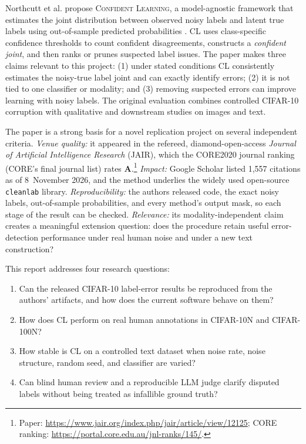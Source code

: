 \documentclass[11pt]{article}
\newcommand{\cl}{\textsc{Confident Learning}}
\newcommand{\cleanlab}{\texttt{cleanlab}}
\begin{document}
Northcutt et al. propose \cl{}, a model-agnostic framework that estimates the
joint distribution between observed noisy labels and latent true labels using
out-of-sample predicted probabilities \citep{northcutt2021confident}. CL uses
class-specific confidence thresholds to count confident disagreements,
constructs a \emph{confident joint}, and then ranks or prunes suspected label
issues. The paper makes three claims relevant to this project: (1) under stated
conditions CL consistently estimates the noisy-true label joint and can
exactly identify errors; (2) it is not tied to one classifier or modality; and
(3) removing suspected errors can improve learning with noisy labels. The
original evaluation combines controlled CIFAR-10 corruption with qualitative
and downstream studies on images and text.

The paper is a strong basis for a novel replication project on several
independent criteria. \emph{Venue quality:} it appeared in the refereed,
diamond-open-access \emph{Journal of Artificial Intelligence Research} (JAIR),
which the CORE2020 journal ranking (CORE's final journal list) rates
\textbf{A}.\footnote{Paper:
\url{https://www.jair.org/index.php/jair/article/view/12125}; CORE ranking:
\url{https://portal.core.edu.au/jnl-ranks/145/}.} \emph{Impact:} Google
Scholar listed 1,557 citations as of 8~November 2026, and the method
underlies the widely used open-source \cleanlab{} library.
\emph{Reproducibility:} the authors released code, the exact noisy labels,
out-of-sample probabilities, and every method's output mask, so each stage of
the result can be checked. \emph{Relevance:} its modality-independent claim
creates a meaningful extension question: does the procedure retain useful
error-detection performance under real human noise and under a new text
construction?

This report addresses four research questions:

\begin{enumerate}
  \item Can the released CIFAR-10 label-error results be reproduced from the
  authors' artifacts, and how does the current software behave on them?
  \item How does CL perform on real human annotations in CIFAR-10N and
  CIFAR-100N?
  \item How stable is CL on a controlled text dataset when noise rate, noise
  structure, random seed, and classifier are varied?
  \item Can blind human review and a reproducible LLM judge clarify disputed
  labels without being treated as infallible ground truth?
\end{enumerate}
\end{document}
